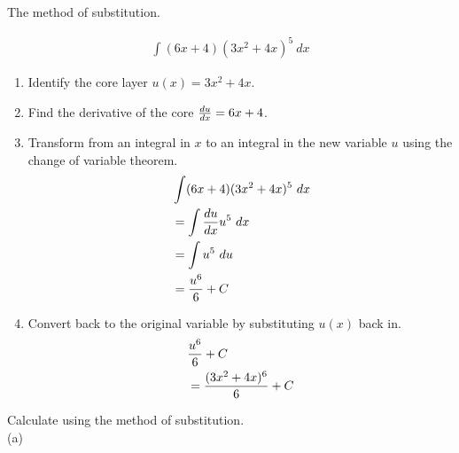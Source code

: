\begin{exercise}\nonumber
    The method of substitution.

    \begin{align}
        \int (6x + 4)(3x^2 + 4x)^5 \ dx
    \end{align}

    \begin{enumerate}
        \item
              Identify the core layer $ u(x) = 3x^2 +4x $. \\

        \item
              Find the derivative of the core $ {du \over dx} = 6x + 4 $. \\

        \item
              Transform from an integral in $ x $ to an integral in the new variable $ u $ using the change of variable theorem. \\
              \begin{align}
                   & \int (6x + 4)(3x^2 + 4x)^5 \ dx \\
                   & = \int {du \over dx}u^5 \ dx    \\
                   & = \int u^5 \ du                 \\
                   & = {u^6 \over 6} + C
              \end{align}

        \item
              Convert back to the original variable by substituting $ u(x) $ back in.
              \begin{align}
                   & {u^6 \over 6} + C             \\
                   & = {(3x^2 + 4x)^6 \over 6} + C
              \end{align}
    \end{enumerate}
\end{exercise}

\begin{exercise}\nonumber
    Calculate using the method of substitution. \\

    (a)

\end{exercise}